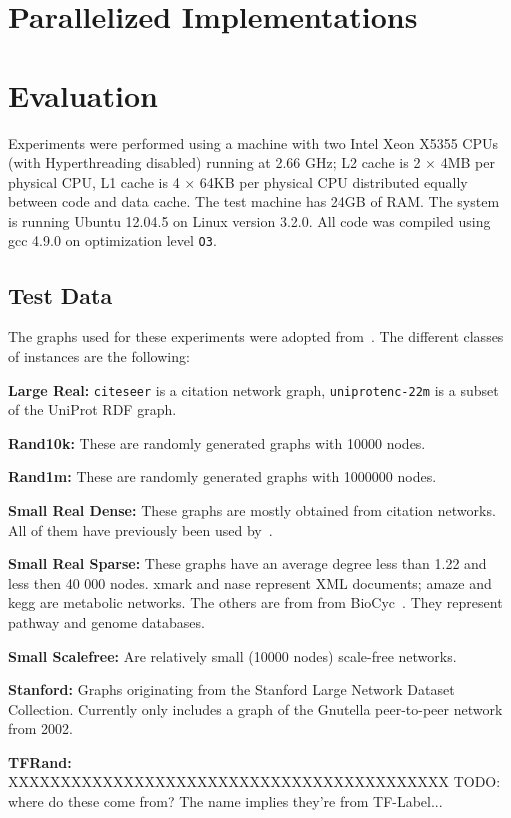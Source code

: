 \documentclass[12pt,a4paper,twoside]{article}
\begin{document}
\section{Parallelized Implementations}

\section{Evaluation}

Experiments were performed using a machine with two Intel Xeon X5355 CPUs (with Hyperthreading disabled) running at 2.66 GHz; L2 cache is 2 $\times$ 4MB per physical CPU, L1 cache is 4 $\times$ 64KB per physical CPU distributed equally between code and data cache. The test machine has 24GB of RAM.
The system is running Ubuntu 12.04.5 on Linux version 3.2.0. All code was compiled using gcc 4.9.0 on optimization level \texttt{O3}.

\subsection{Test Data}

The graphs used for these experiments were adopted from~\cite{preach}. The different classes of instances are the following:
\begin{description}
  \item{\textbf{Large Real:}} \verb|citeseer| is a citation network graph, \verb|uniprotenc-22m| is a subset of the UniProt RDF graph.
  \item{\textbf{Rand10k:}} These are randomly generated graphs with 10000 nodes.
  \item{\textbf{Rand1m:}} These are randomly generated graphs with 1000000 nodes.
  \item{\textbf{Small Real Dense:}} These graphs are mostly obtained from citation networks. All of them have previously been used by~\cite{Jin:2009:HIS:1559845.1559930}.
  \item{\textbf{Small Real Sparse:}} These graphs have an average degree less than 1.22 and less then
    40 000 nodes. xmark and nase represent XML documents; amaze and kegg are metabolic
    networks. The others are from from BioCyc~\cite{grail}. They represent pathway and genome
    databases.
  \item{\textbf{Small Scalefree:}} Are relatively small (10000 nodes) scale-free networks.
  \item{\textbf{Stanford:}} Graphs originating from the Stanford Large Network Dataset Collection. Currently only includes a graph of the Gnutella peer-to-peer network from 2002.
  \item{\textbf{TFRand:}} XXXXXXXXXXXXXXXXXXXXXXXXXXXXXXXXXXXXXXXXXX TODO: where do these come from? The name implies they're from TF-Label...
\end{description}
\end{document}
